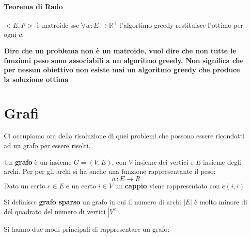 \documentclass[a4paper,12pt, oneside]{book}
\begin{document}
\subsubsection{Teorema di Rado}
\begin{teorema}
  $<E,F>$ è matroide sse $\forall w:E\to \mathbb{R}^+$ l'algortimo
  greedy restituisce l'ottimo per ogni $w$
\end{teorema}
\textbf{Dire che un problema non è un matroide, vuol dire
  che non tutte le funzioni peso sono associabili a un algoritmo
  greedy. Non significa che per nessun obiettivo non esiste mai un
  algoritmo greedy che produce la soluzione ottima}
\chapter{Grafi}
Ci occupiamo ora della risoluzione di quei problemi che possono essere
ricondotti ad un grafo per essere risolti.
\begin{definizione}
  Un \textbf{grafo} è un insieme $G=(V,E)$, con $V$ insieme dei vertici
  e $E$ insieme degli archi. Per per gli archi si ha anche una funzione
  rappresentante il peso:
  \[w:E\to\mathit{R}\]
  Dato un certo $e\in E$ e un certo $i\in V$ un \textbf{cappio} viene
  rappresentato con $e(i,i)$
\end{definizione}
\begin{definizione}
  Si definisce \textbf{grafo sparso} un grafo in cui il numero di
  archi $|E|$ è molto minore di del quadrato del numero di vertici
  $|V^2|$. 
\end{definizione}
\newpage
Si hanno due modi principali di rappresentare un grafo:
\end{document}
